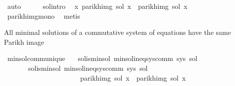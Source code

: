 \begin{isabellebody}
\ auto\isanewline
\ \ \ \ \isamarkupfalse%
\ sol{\isacharprime}{\kern0pt}{\isacharprime}{\kern0pt}{\isacharunderscore}{\kern0pt}intro\ \isamarkupfalse%
\ {\isachardoublequoteopen}{\isasymforall}x{\isachardot}{\kern0pt}\ parikh{\isacharunderscore}{\kern0pt}img\ {\isacharparenleft}{\kern0pt}sol\ x{\isacharparenright}{\kern0pt}\ {\isasymsubseteq}\ parikh{\isacharunderscore}{\kern0pt}img\ {\isacharparenleft}{\kern0pt}sol{\isacharprime}{\kern0pt}\ x{\isacharparenright}{\kern0pt}{\isachardoublequoteclose}\isanewline
\ \ \ \ \ \ \isamarkupfalse%
\ parikh{\isacharunderscore}{\kern0pt}img{\isacharunderscore}{\kern0pt}mono\ \isamarkupfalse%
\ metis\isanewline
\ \ \isamarkupfalse%
\isanewline
{}\isamarkupfalse%
%
\endisatagproof
{\isafoldproof}%
%
\isadelimproof
%
\endisadelimproof
%
\begin{isamarkuptext}%
All minimal solutions of a commutative system of equations have the same Parikh image%
\end{isamarkuptext}\isamarkuptrue%
\isamarkupfalse%
\ min{\isacharunderscore}{\kern0pt}sol{\isacharunderscore}{\kern0pt}comm{\isacharunderscore}{\kern0pt}unique{\isacharcolon}{\kern0pt}\isanewline
\ \ \ sol{}{\isacharunderscore}{\kern0pt}is{\isacharunderscore}{\kern0pt}min{\isacharunderscore}{\kern0pt}sol{\isacharcolon}{\kern0pt}\ {\isachardoublequoteopen}min{\isacharunderscore}{\kern0pt}sol{\isacharunderscore}{\kern0pt}ineq{\isacharunderscore}{\kern0pt}sys{\isacharunderscore}{\kern0pt}comm\ sys\ sol{}{\isachardoublequoteclose}\isanewline
\ \ \ \ \ \ \ sol{}{\isacharunderscore}{\kern0pt}is{\isacharunderscore}{\kern0pt}min{\isacharunderscore}{\kern0pt}sol{\isacharcolon}{\kern0pt}\ {\isachardoublequoteopen}min{\isacharunderscore}{\kern0pt}sol{\isacharunderscore}{\kern0pt}ineq{\isacharunderscore}{\kern0pt}sys{\isacharunderscore}{\kern0pt}comm\ sys\ sol{}{\isachardoublequoteclose}\isanewline
\ \ \ \ \ \ \ \ \ \ \ \ \ \ \ \ \ \ \ \ \ \ {\isachardoublequoteopen}parikh{\isacharunderscore}{\kern0pt}img\ {\isacharparenleft}{\kern0pt}sol{}\ x{\isacharparenright}{\kern0pt}\ {\isacharequal}{\kern0pt}\ parikh{\isacharunderscore}{\kern0pt}img\ {\isacharparenleft}{\kern0pt}sol{}\ x{\isacharparenright}{\kern0pt}{\isachardoublequoteclose}\isanewline
%
\isadelimproof
%
\endisadelimproof
%
\isatagproof
{}\isamarkupfalse%
\ {\isacharminus}{\kern0pt}\isanewline

\end{isabellebody}
